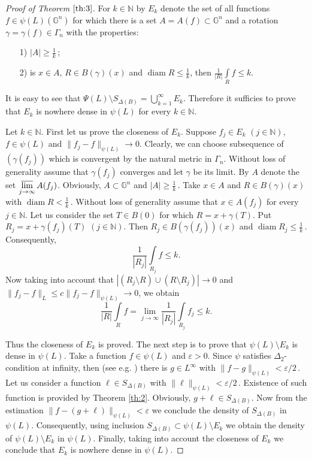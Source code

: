 \documentclass[12pt,reqno]{article}
\theoremstyle{remark}
\newcommand{\diam}{\operatorname{diam}}
\newcommand{\olim}{\operatornamewithlimits{\overline{lim}}}
\begin{document}
\begin{proof}[Proof of Theorem $\ref{th:3}$]
For $k\in\mathbb{N}$ by $E_k$ denote the set of all functions $f\in \psi(L)(\mathbb{G}^n)$ for which there is a set $A=A(f)\subset \mathbb{G}^n$ and a rotation $\gamma=\gamma(f)\in\Gamma_n$ with the properties:
\begin{itemize}
\item[1)] $|A|\geq\frac{1}{k}$\,;

\item[2)] is $x\in A$, $R\in B(\gamma)(x)$ and $\diam R\leq\frac{1}{k}$, then $\frac{1}{|R|}\int\limits_R f\leq k$.
\end{itemize}

It is easy to see that $\Psi(L)\setminus S_{\Delta(B)}=\bigcup\limits_{k=1}^\infty E_k$. Therefore it sufficies to prove that $E_k$ is nowhere dense in $\psi(L)$ for every $k\in\mathbb{N}$.

Let $k\in\mathbb{N}$. First let us prove the closeness of $E_k$. Suppose $f_j\in E_k$ $(j\in\mathbb{N})$, $f\in\psi(L)$ and $\|f_j-f\|_{\psi(L)}\to 0$. Clearly, we can choose subsequence of $(\gamma(f_j))$ which is convergent by the natural metric in $\Gamma_n$. Without loss of generality assume that $\gamma(f_j)$ converges and let $\gamma$ be its limit. By $A$ denote the set $\olim\limits_{j\rightarrow\infty} A(f_j)$. Obviously, $A\subset \mathbb{G}^n$ and $|A|\geq\frac{1}{k}$\,. Take $x\in A$ and $R\in B(\gamma)(x)$ with $\diam R<\frac{1}{k}$\,. Without loss of generality assume that $x\in A(f_j)$ for every $j\in\mathbb{N}$. Let us consider the set $T\in B(0)$ for which $R=x+\gamma(T)$. Put $R_j=x+\gamma(f_j)(T)$ $(j\in\mathbb{N})$. Then $R_j\in B(\gamma(f_j))(x)$ and $\diam R_j\leq\frac{1}{k}$\,. Consequently,
$$  \frac{1}{|R_j|}\int\limits_{R_j} f\leq k.       $$
Now taking into account that $|(R_j\setminus R)\cup(R\setminus R_j)|\to 0$ and $\|f_j-f\|_L\leq c\|f_j-f\|_{\psi(L)}\rightarrow 0$, we obtain
$$  \frac{1}{|R|}\int\limits_{R} f=\lim_{j\to\infty} \frac{1}{|R_j|}\int\limits_{R_j} f_j\leq k.       $$

Thus the closeness of $E_k$ is proved. The next step is to prove that $\psi(L)\setminus E_k$ is dense in $\psi(L)$. Take a function $f\in\psi(L)$ and $\varepsilon>0$. Since $\psi$ satisfies $\Delta_2$-condition at infinity, then (see e.g. \cite[\S~4]{10}) there is $g\in L^\infty$ with $\|f-g\|_{\psi(L)}<\varepsilon/2$\,. Let us consider a function $\ell\in S_{\Delta(B)}$ with $\|\ell\|_{\psi(L)}<\varepsilon/2$\,. Existence of such function is provided by Theorem \ref{th:2}. Obviously, $g+\ell\in S_{\Delta(B)}$. Now from the estimation $\|f-(g+\ell)\|_{\psi(L)}<\varepsilon$ we conclude the density of $S_{\Delta(B)}$ in $\psi(L)$. Consequently, using inclusion $S_{\Delta(B)}\subset \psi(L)\setminus E_k$ we obtain the density of $\psi(L)\setminus E_k$ in $\psi(L)$. Finally, taking into account the closeness of $E_k$ we conclude that $E_k$ is nowhere dense in $\psi(L)$.
\end{proof}
\end{document}
